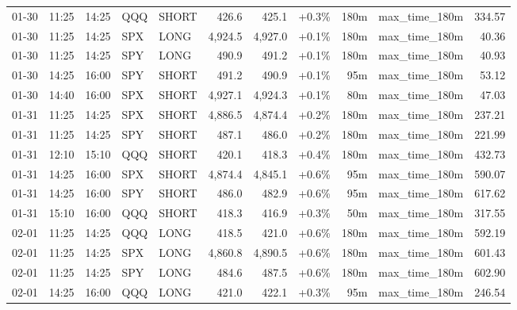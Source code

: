 \documentclass[11pt,a4paper,twoside]{article}
\begin{document}
\begin{center}
\begin{longtable}{>{\color{txtmain}}l l l l l r r r r >{\color{txtmain}}l r}
01-30 & 11:25 & 14:25 & QQQ & SHORT & 426.6 & 425.1 & \textcolor{wingreen}{+0.3\%} & 180m & max\_time\_180m & \textcolor{wingreen}{334.57} \\
01-30 & 11:25 & 14:25 & SPX & LONG & 4,924.5 & 4,927.0 & \textcolor{wingreen}{+0.1\%} & 180m & max\_time\_180m & \textcolor{wingreen}{40.36} \\
01-30 & 11:25 & 14:25 & SPY & LONG & 490.9 & 491.2 & \textcolor{wingreen}{+0.1\%} & 180m & max\_time\_180m & \textcolor{wingreen}{40.93} \\
01-30 & 14:25 & 16:00 & SPY & SHORT & 491.2 & 490.9 & \textcolor{wingreen}{+0.1\%} & 95m & max\_time\_180m & \textcolor{wingreen}{53.12} \\
01-30 & 14:40 & 16:00 & SPX & SHORT & 4,927.1 & 4,924.3 & \textcolor{wingreen}{+0.1\%} & 80m & max\_time\_180m & \textcolor{wingreen}{47.03} \\
01-31 & 11:25 & 14:25 & SPX & SHORT & 4,886.5 & 4,874.4 & \textcolor{wingreen}{+0.2\%} & 180m & max\_time\_180m & \textcolor{wingreen}{237.21} \\
01-31 & 11:25 & 14:25 & SPY & SHORT & 487.1 & 486.0 & \textcolor{wingreen}{+0.2\%} & 180m & max\_time\_180m & \textcolor{wingreen}{221.99} \\
01-31 & 12:10 & 15:10 & QQQ & SHORT & 420.1 & 418.3 & \textcolor{wingreen}{+0.4\%} & 180m & max\_time\_180m & \textcolor{wingreen}{432.73} \\
01-31 & 14:25 & 16:00 & SPX & SHORT & 4,874.4 & 4,845.1 & \textcolor{wingreen}{+0.6\%} & 95m & max\_time\_180m & \textcolor{wingreen}{590.07} \\
01-31 & 14:25 & 16:00 & SPY & SHORT & 486.0 & 482.9 & \textcolor{wingreen}{+0.6\%} & 95m & max\_time\_180m & \textcolor{wingreen}{617.62} \\
01-31 & 15:10 & 16:00 & QQQ & SHORT & 418.3 & 416.9 & \textcolor{wingreen}{+0.3\%} & 50m & max\_time\_180m & \textcolor{wingreen}{317.55} \\
02-01 & 11:25 & 14:25 & QQQ & LONG & 418.5 & 421.0 & \textcolor{wingreen}{+0.6\%} & 180m & max\_time\_180m & \textcolor{wingreen}{592.19} \\
02-01 & 11:25 & 14:25 & SPX & LONG & 4,860.8 & 4,890.5 & \textcolor{wingreen}{+0.6\%} & 180m & max\_time\_180m & \textcolor{wingreen}{601.43} \\
02-01 & 11:25 & 14:25 & SPY & LONG & 484.6 & 487.5 & \textcolor{wingreen}{+0.6\%} & 180m & max\_time\_180m & \textcolor{wingreen}{602.90} \\
02-01 & 14:25 & 16:00 & QQQ & LONG & 421.0 & 422.1 & \textcolor{wingreen}{+0.3\%} & 95m & max\_time\_180m & \textcolor{wingreen}{246.54} \\

\end{longtable}
\end{center}
\end{document}
